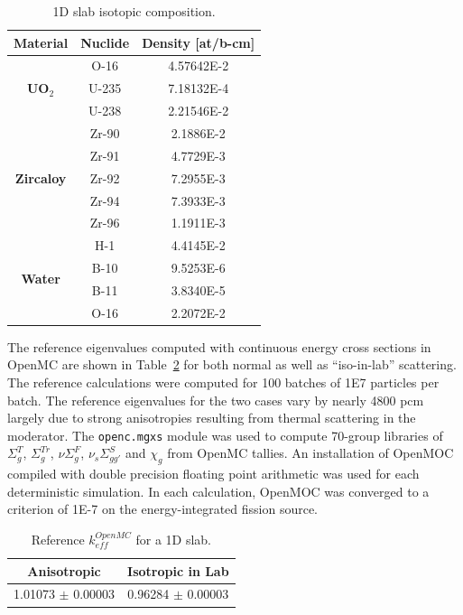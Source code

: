 \begin{table}[h!]
  \centering
  \caption{1D slab isotopic composition.}
  \label{table:chap2-slab-isotopes} 
  \vspace{14pt}
  \begin{tabular}{c c c}
  \toprule
  \multicolumn{1}{c}{\bf Material} &
  \multicolumn{1}{c}{\bf Nuclide} &
  \multicolumn{1}{c}{\bf Density [at/b-cm]} \\
  \midrule
  \multirow{3}{*}{\bf UO$_2$} &  O-16 &  4.57642E-2 \\
  & U-235 & 7.18132E-4 \\
  & U-238 & 2.21546E-2 \\
  \midrule
  \multirow{5}{*}{\bf Zircaloy} & Zr-90 & 2.1886E-2 \\
  & Zr-91 & 4.7729E-3 \\
  & Zr-92 & 7.2955E-3 \\
  & Zr-94 & 7.3933E-3 \\
  & Zr-96 & 1.1911E-3 \\
  \midrule
  \multirow{4}{*}{\bf Water} & H-1 &  4.4145E-2 \\
  & B-10 & 9.5253E-6 \\
  & B-11 & 3.8340E-5 \\
  & O-16 & 2.2072E-2 \\
  \bottomrule
\end{tabular}
\end{table}

The reference eigenvalues computed with continuous energy cross sections in OpenMC are shown in Table~\ref{table:chap2-slab-reference} for both normal as well as ``iso-in-lab'' scattering. The reference calculations were computed for 100 batches of 1E7 particles per batch. The reference eigenvalues for the two cases vary by nearly 4800 pcm largely due to strong anisotropies resulting from thermal scattering in the moderator. The \texttt{openc.mgxs} module was used to compute 70-group libraries of $\Sigma^T_g$, $\Sigma^{Tr}_g$, $\nu\Sigma^F_g$, $\nu_s\Sigma^S_{gg'}$ and $\chi_g$ from OpenMC tallies. An installation of OpenMOC compiled with double precision floating point arithmetic was used for each deterministic simulation. In each calculation, OpenMOC was converged to a criterion of 1E-7 on the energy-integrated fission source.

\begin{table}[h!]
  \centering
  \caption{Reference $k^{OpenMC}_{eff}$ for a 1D slab.}
  \label{table:chap2-slab-reference} 
  \vspace{14pt}
  \begin{tabular}{c c}
  \toprule
  \multicolumn{1}{c}{\bf Anisotropic} &
  \multicolumn{1}{c}{\bf Isotropic in Lab} \\
  \midrule
  1.01073 $\pm$ 0.00003 & 0.96284 $\pm$ 0.00003 \\
  \bottomrule
\end{tabular}
\end{table}

